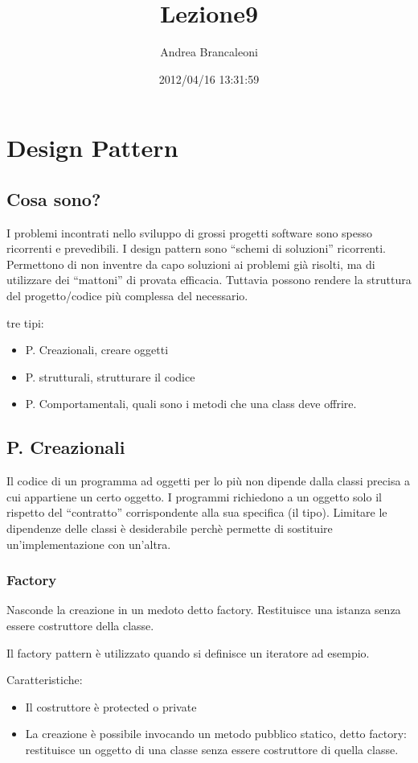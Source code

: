 \documentclass[a5paper]{article}
\author{Andrea Brancaleoni}
\title{Lezione9}
\date{2012/04/16 13:31:59}
\begin{document}
  \maketitle

  \section{Design Pattern}
    \subsection{Cosa sono?}
      I problemi incontrati nello sviluppo di grossi progetti software sono spesso ricorrenti e prevedibili. I design pattern sono ``schemi di soluzioni'' ricorrenti. Permettono di non inventre da capo soluzioni ai problemi già risolti, ma di utilizzare dei ``mattoni'' di provata efficacia. Tuttavia possono rendere la struttura del progetto/codice più complessa del necessario.

      tre tipi:
      \begin{itemize}
        \item P. Creazionali, creare oggetti
        \item P. strutturali, strutturare il codice
        \item P. Comportamentali, quali sono i metodi che una class deve offrire.
      \end{itemize}

    \subsection{P. Creazionali}
      Il codice di un programma ad oggetti per lo più non dipende dalla classi precisa a cui appartiene un certo oggetto. I programmi richiedono a un oggetto solo il rispetto del ``contratto'' corrispondente alla sua specifica (il tipo). Limitare le dipendenze delle classi è desiderabile perchè permette di sostituire un'implementazione con un'altra.

      \subsubsection{Factory}
        Nasconde la creazione in un medoto detto factory. Restituisce una istanza senza essere costruttore della classe.

        Il factory pattern è utilizzato quando si definisce un iteratore ad esempio.

        Caratteristiche:
        \begin{itemize}
          \item Il costruttore è protected o private
          \item La creazione è possibile invocando un metodo pubblico statico, detto factory: restituisce un oggetto di una classe senza essere costruttore di quella classe.
        \end{itemize}
\end{document}
